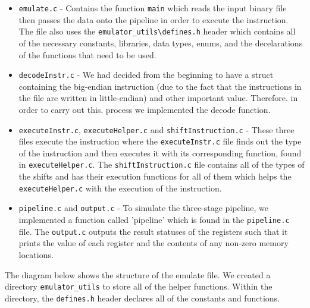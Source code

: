 \documentclass[10pt]{article}
\begin{document}
\begin{itemize}
	\item {\tt{emulate.c}} - Contains the function {\tt{main}} which reads the input binary file then passes the data onto the pipeline in order to execute the instruction. The file also uses the {\tt{emulator\_utils\textbackslash defines.h}} header which contains all of the necessary constants, libraries, data types, enums, and the decelarations of the functions that need to be used.
	\item {\tt{decodeInstr.c}} - We had decided from the beginning to have a struct containing the big-endian instruction (due to the fact that the instructions in the file are written in little-endian) and other important value. Therefore. in order to carry out this. process we implemented the decode function.
	\item {\tt{executeInstr.c}}, {\tt{executeHelper.c}} and {\tt{shiftInstruction.c}} - These three files execute the instruction where the {\tt{executeInstr.c}} file finds out the type of the instruction and then executes it with its corresponding function, found in {\tt{executeHelper.c}}. The {\tt{shiftInstruction.c}} file contains all of the types of the shifts and has their execution functions for all of them which helps the {\tt{executeHelper.c}} with the execution of the instruction.
	\item {\tt{pipeline.c}} and {\tt{output.c}} - To simulate the three-stage pipeline, we implemented a function called 'pipeline' which is found in the {\tt{pipeline.c}} file. The {\tt{output.c}} outputs the result statuses of the registers such that it prints the value of each register and the contents of any non-zero memory locations.
	
\end{itemize}


The diagram below shows the structure of the emulate file. We created a directory {\tt{emulator\_utils}} to store all of the helper functions. Within the directory, the {\tt{defines.h}} header declares all of the constants and functions.
\begin{center}

\end{center}
\end{document}
